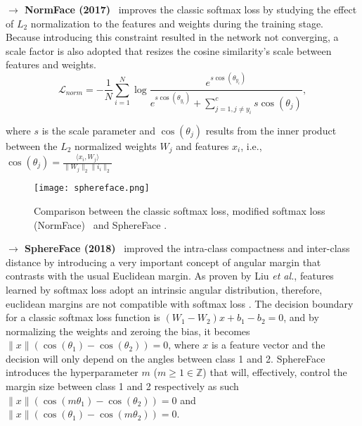 \documentclass[class=report, crop=false, a4paper, 12pt]{standalone}
\begin{document}
\vspace{0.7\baselineskip}
\noindent\textbf{$\rightarrow$ NormFace (2017)}~\autocite{wangNormFaceL2Hypersphere2017} improves the classic softmax loss by studying the effect of $L_2$ normalization to the features and weights during the training stage. Because introducing this constraint resulted in the network not converging, a scale factor is also adopted that resizes the cosine similarity's scale between features and weights. 
\begin{equation}
\mathcal{L}_{norm} = -\frac{1}{N}\sum_{i=1}^{N}\log{\frac{e^{s \cos{(\theta_{y_i})}}}{e^{s \cos{(\theta_{y_i})}}+\sum_{j=1, j\neq y_i}^{c}s \cos{(\theta_{j})}}},
\end{equation}

\noindent where $s$ is the scale parameter and $\cos{(\theta_j)}$ results from the inner product between the $L_2$ normalized  weights $W_j$ and features $x_i$, i.e., $\cos{(\theta_j)}=\frac{\langle x_i, W_j\rangle}{\|W_j\|_2\|i_i\|_2}$

\begin{figure}[!h]
    \centering
    \texttt{[image: sphereface.png]}
    \caption{Comparison between the classic softmax loss, modified softmax loss (NormFace)~\autocite{wangNormFaceL2Hypersphere2017} and SphereFace \autocite{liuSphereFaceDeepHypersphere2018}.}
    \label{fig:sphereface}
\end{figure}

\vspace{0.7\baselineskip}
\noindent\textbf{$\rightarrow$ SphereFace (2018)}~\autocite{liuSphereFaceDeepHypersphere2018} improved the intra-class compactness and inter-class distance by introducing a very important concept of angular margin that contrasts with the usual Euclidean margin. As proven by Liu \textit{et al.}, features learned by softmax loss adopt an intrinsic angular distribution, therefore, euclidean margins are not compatible with softmax loss . The decision boundary for a classic softmax loss function is $(W_1 - W_2)x+b_1-b_2=0$, and by normalizing the weights and zeroing the bias, it becomes $\|x\|(\cos{(\theta_1)}-\cos{(\theta_2)})=0$, where $x$ is a feature vector and the decision will only depend on the angles between class 1 and 2. SphereFace introduces the hyperparameter $m$ ($m\geq1 \in \mathbb{Z}$) that will, effectively, control the margin size between class 1 and 2 respectively as such $\|x\|(\cos{(m\theta_1)}-\cos{(\theta_2)})=0$ and $\|x\|(\cos{(\theta_1)}-\cos{(m\theta_2)})=0$.
\end{document}
